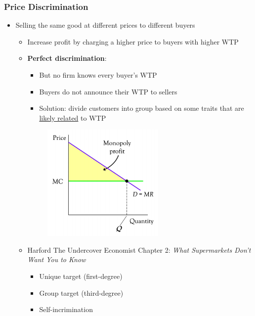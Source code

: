 \documentclass{article}
\begin{document}
\begin{multicols}{2}
\subsubsection{Price Discrimination}
\begin{itemize}
	\item Selling the same good at different prices to different buyers
	\begin{itemize}
		\item Increase profit by charging a higher price to buyers with higher WTP
		\item \textbf{Perfect discrimination}:
		\begin{itemize}
			\item But no firm knows every buyer's WTP
			\item Buyers do not announce their WTP to sellers
			\item Solution: divide customers into group based on some traits that are \underline{likely related} to WTP
		\end{itemize}
		\begin{figure}[H]
			\includegraphics[width=16em]{images/price_discrimination.png}
			\centering
		\end{figure}
	    \item Harford The Undercover Economist Chapter 2: \textit{What Supermarkets Don't Want You to Know}
	    \begin{itemize}
	    	\item Unique target (first-degree)
	    	\item Group target (third-degree)
	    	\item Self-incrimination
	    \end{itemize}
	\end{itemize}
\end{itemize}

\end{multicols}
\end{document}
